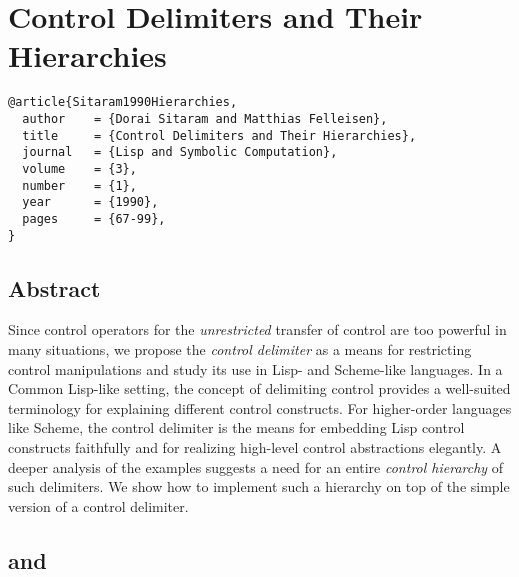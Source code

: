 \documentclass[letterpaper]{llncs}
\begin{document}
\section*{Control Delimiters and Their Hierarchies}%

\begin{verbatim}
@article{Sitaram1990Hierarchies,
  author    = {Dorai Sitaram and Matthias Felleisen},
  title     = {Control Delimiters and Their Hierarchies},
  journal   = {Lisp and Symbolic Computation},
  volume    = {3},
  number    = {1},
  year      = {1990},
  pages     = {67-99},
}
\end{verbatim}

\subsection*{Abstract}
Since control operators for the \textit{unrestricted} transfer of control are too powerful in many situations, we propose the \textit{control delimiter} as a means for restricting control manipulations and study its use in Lisp- and Scheme-like languages. In a Common Lisp-like setting, the concept of delimiting control provides a well-suited terminology for explaining different control constructs. For higher-order languages like Scheme, the control delimiter is the means for embedding Lisp control constructs faithfully and for realizing high-level control abstractions elegantly. A deeper analysis of the examples suggests a need for an entire \textit{control hierarchy} of such delimiters. We show how to implement such a hierarchy on top of the simple version of a control delimiter.

\subsection*{\ctrl and \run}
\end{document}
